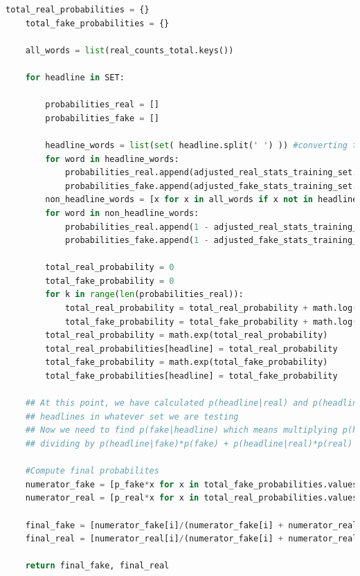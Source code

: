 \documentclass{article}
\begin{document}
\begin{enumerate}
\begin{lstlisting}[language=Python]
    total_real_probabilities = {}
    total_fake_probabilities = {}
    
    all_words = list(real_counts_total.keys())
    
    for headline in SET:
         
        probabilities_real = []
        probabilities_fake = []
        
        headline_words = list(set( headline.split(' ') )) #converting to set and back to a list removes duplicates
        for word in headline_words:
            probabilities_real.append(adjusted_real_stats_training_set.get(word))
            probabilities_fake.append(adjusted_fake_stats_training_set.get(word))
        non_headline_words = [x for x in all_words if x not in headline_words]
        for word in non_headline_words:
            probabilities_real.append(1 - adjusted_real_stats_training_set.get(word))
            probabilities_fake.append(1 - adjusted_fake_stats_training_set.get(word))
        
        total_real_probability = 0
        total_fake_probability = 0
        for k in range(len(probabilities_real)):
            total_real_probability = total_real_probability + math.log(probabilities_real[k])
            total_fake_probability = total_fake_probability + math.log(probabilities_fake[k])
        total_real_probability = math.exp(total_real_probability)
        total_real_probabilities[headline] = total_real_probability
        total_fake_probability = math.exp(total_fake_probability)
        total_fake_probabilities[headline] = total_fake_probability

    ## At this point, we have calculated p(headline|real) and p(headline|fake) for all
    ## headlines in whatever set we are testing
    ## Now we need to find p(fake|headline) which means multiplying p(headline|fake) by p(fake) and 
    ## dividing by p(headline|fake)*p(fake) + p(headline|real)*p(real) 

    #Compute final probabilites
    numerator_fake = [p_fake*x for x in total_fake_probabilities.values()]
    numerator_real = [p_real*x for x in total_real_probabilities.values()]
    
    final_fake = [numerator_fake[i]/(numerator_fake[i] + numerator_real[i]) for i in range(len(numerator_fake))]
    final_real = [numerator_real[i]/(numerator_fake[i] + numerator_real[i]) for i in range(len(numerator_real))]

    return final_fake, final_real
  \end{lstlisting}


\end{enumerate}
\end{document}
